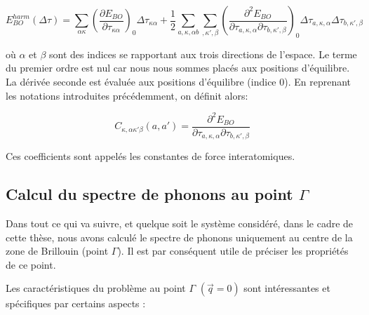 \begin{equation}
E_{BO}^{harm}(\Delta\tau) = \sum_{\alpha\kappa} \left(\frac{\partial E_{BO}}{\partial\tau_{\kappa\alpha}}\right)_{0} \Delta\tau_{\kappa\alpha} + \frac{1}{2} \sum_{a,\kappa,\alpha b} \sum_{,\kappa',\beta} \left(\frac{\partial^{2}E_{BO}}{\partial\tau_{a,\kappa,\alpha}\partial\tau_{b,\kappa',\beta}}\right)_{0} \Delta\tau_{a,\kappa,\alpha}\Delta\tau_{b,\kappa',\beta}
\end{equation}

où $\alpha$ et $\beta$ sont des indices se rapportant aux trois directions de l'espace. Le terme du premier ordre est nul car nous nous sommes placés aux positions d'équilibre. La dérivée seconde est évaluée aux positions d'équilibre (indice 0). En reprenant les notations introduites précédemment, on définit alors: 

\begin{equation}
C_{\kappa,\alpha\kappa'\beta}(a,a') = \frac{\partial^{2}E_{BO}}{\partial\tau_{a,\kappa,\alpha}\partial\tau_{b,\kappa',\beta}}
\end{equation}

Ces coefficients sont appelés les constantes de force interatomiques. 

\subsection{Calcul du spectre de phonons au point $\Gamma$}

Dans tout ce qui va suivre, et quelque soit le système considéré, dans le cadre de cette thèse, nous avons calculé le spectre de phonons uniquement au centre de la zone de Brillouin (point $\Gamma$). Il est par conséquent utile de préciser les propriétés de ce point. 


Les caractéristiques du problème au point $\Gamma$ $(\overrightarrow{q}= 0)$ sont intéressantes et spécifiques par certains aspects :


